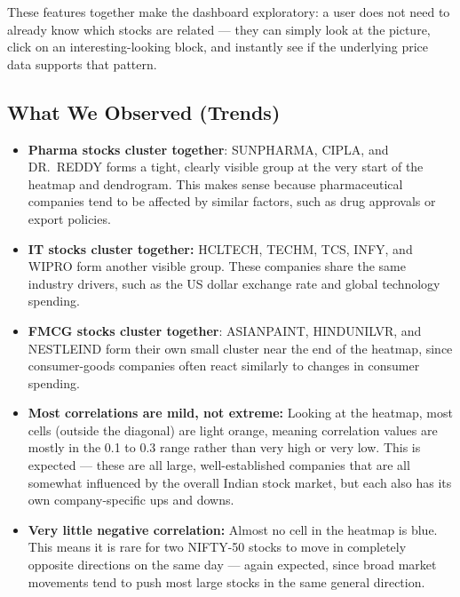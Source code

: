 \documentclass[14pt,a4paper]{extreport}
\begin{document}
These features together make the dashboard exploratory: a user does not
need to already know which stocks are related --- they can simply look at
the picture, click on an interesting-looking block, and instantly see if
the underlying price data supports that pattern.

\subsection{What We Observed (Trends)}
\begin{itemize}
    \item \textbf{Pharma stocks cluster together}: SUNPHARMA, CIPLA, and
        DR.\ REDDY forms a tight, clearly visible group at the very start
        of the heatmap and dendrogram. This makes sense because
        pharmaceutical companies tend to be affected by similar factors,
        such as drug approvals or export policies.
    \item \textbf{IT stocks cluster together:} HCLTECH, TECHM, TCS, INFY,
        and WIPRO form another visible group. These companies share the
        same industry drivers, such as the US dollar exchange rate and
        global technology spending.
    \item \textbf{FMCG stocks cluster together}: ASIANPAINT, HINDUNILVR,
        and NESTLEIND form their own small cluster near the end of the
        heatmap, since consumer-goods companies often react similarly to
        changes in consumer spending.
    \item \textbf{Most correlations are mild, not extreme:} Looking at the
        heatmap, most cells (outside the diagonal) are light orange,
        meaning correlation values are mostly in the 0.1 to 0.3 range
        rather than very high or very low. This is expected --- these are
        all large, well-established companies that are all somewhat
        influenced by the overall Indian stock market, but each also has
        its own company-specific ups and downs.
    \item \textbf{Very little negative correlation:} Almost no cell in
        the heatmap is blue. This means it is rare for two NIFTY-50 stocks
        to move in completely opposite directions on the same day ---
        again expected, since broad market movements tend to push most
        large stocks in the same general direction.
\end{itemize}
\end{document}
